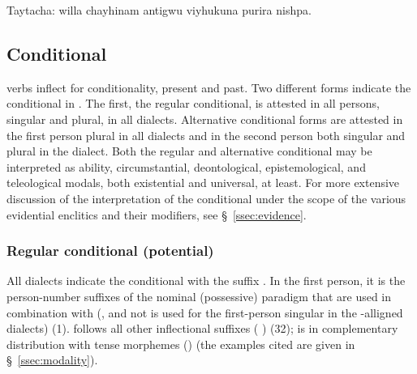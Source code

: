 %
{Taytacha: willa chayhinam antigwu viyhukuna purira nishpa.}%
{}%
{}{}%

\subsection{Conditional}\label{ssec:conditional}
\SYQ{} verbs inflect for conditionality, present and past. Two different forms indicate the conditional in \SYQ{}. The first, the regular conditional, is attested in all persons, singular and plural, in all dialects. Alternative conditional forms are attested in the first person plural in all dialects and in the second person both singular and plural in the \AMV{} dialect. Both the regular and alternative conditional may be interpreted as ability, circumstantial, deontological, epistemological, and teleological modals, both existential and universal, at least. For more extensive discussion of the interpretation of the conditional under the scope of the various evidential enclitics and their modifiers, see \S~\ref{ssec:evidence}.

\subsubsection{Regular conditional (potential) }\label{ssec:regcond}
All \SYQ{} dialects indicate the conditional with the suffix . In the first person, it is the person-number suffixes of the nominal (possessive) paradigm that are used in combination with  (\ie{},  and not  is used for the first-person singular in the \QII{}-alligned dialects) (1).  follows all other inflectional suffixes ( ) (32);  is in complementary distribution with tense morphemes () (the examples cited are given in \S~\ref{ssec:modality}).

